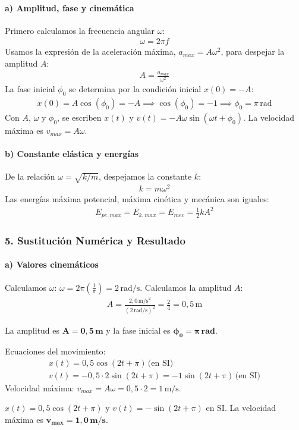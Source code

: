 \paragraph*{a) Amplitud, fase y cinemática}
Primero calculamos la frecuencia angular $\omega$:
\begin{gather}
    \omega = 2\pi f
\end{gather}
Usamos la expresión de la aceleración máxima, $a_{max} = A\omega^2$, para despejar la amplitud $A$:
\begin{gather}
    A = \frac{a_{max}}{\omega^2}
\end{gather}
La fase inicial $\phi_0$ se determina por la condición inicial $x(0)=-A$:
\begin{gather}
    x(0) = A \cos(\phi_0) = -A \implies \cos(\phi_0) = -1 \implies \phi_0 = \pi \, \text{rad}
\end{gather}
Con $A$, $\omega$ y $\phi_0$, se escriben $x(t)$ y $v(t) = -A\omega \sin(\omega t + \phi_0)$. La velocidad máxima es $v_{max} = A\omega$.

\paragraph*{b) Constante elástica y energías}
De la relación $\omega = \sqrt{k/m}$, despejamos la constante $k$:
\begin{gather}
    k = m\omega^2
\end{gather}
Las energías máxima potencial, máxima cinética y mecánica son iguales:
\begin{gather}
    E_{pe,max} = E_{k,max} = E_{mec} = \frac{1}{2}kA^2
\end{gather}

\subsubsection*{5. Sustitución Numérica y Resultado}
\paragraph*{a) Valores cinemáticos}
Calculamos $\omega$: $\omega = 2\pi \left(\frac{1}{\pi}\right) = 2 \, \text{rad/s}$.
Calculamos la amplitud $A$:
\begin{gather}
    A = \frac{2,0 \, \text{m/s}^2}{(2 \, \text{rad/s})^2} = \frac{2}{4} = 0,5 \, \text{m}
\end{gather}
\begin{cajaresultado}
    La amplitud es $\boldsymbol{A=0,5 \, \textbf{m}}$ y la fase inicial es $\boldsymbol{\phi_0 = \pi \, \textbf{rad}}$.
\end{cajaresultado}
Ecuaciones del movimiento:
\begin{gather}
    x(t) = 0,5 \cos(2t + \pi) \, \text{(en SI)} \\
    v(t) = -0,5 \cdot 2 \sin(2t + \pi) = -1 \sin(2t + \pi) \, \text{(en SI)}
\end{gather}
Velocidad máxima: $v_{max} = A\omega = 0,5 \cdot 2 = 1 \, \text{m/s}$.
\begin{cajaresultado}
    $x(t) = 0,5 \cos(2t + \pi)$ y $v(t) = -\sin(2t+\pi)$ en SI. La velocidad máxima es $\boldsymbol{v_{max} = 1,0 \, \textbf{m/s}}$.
\end{cajaresultado}

